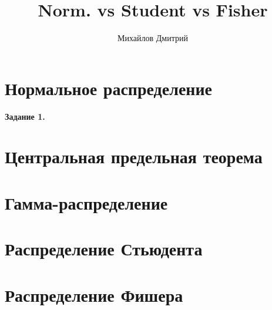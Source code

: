 \documentclass[12pt]{article}
\begin{document}
\title{Norm. vs Student vs Fisher}
\author{Михайлов Дмитрий}
\maketitle
\section{Нормальное распределение}


\begin{center}
	\textbf{Задание 1.}
\end{center}
\section{Центральная предельная теорема}
\section{Гамма-распределение}
\section{Распределение Стьюдента}
\section{Распределение Фишера}
\end{document}

